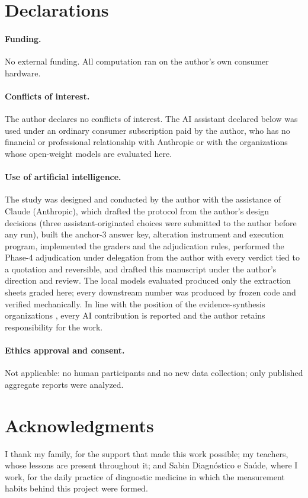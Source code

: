 \documentclass[11pt]{article}
\begin{document}
\section*{Declarations}
\paragraph{Funding.} No external funding. All computation ran on the author's own consumer hardware.

\paragraph{Conflicts of interest.} The author declares no conflicts of interest. The AI assistant declared below was used under an ordinary consumer subscription paid by the author, who has no financial or professional relationship with Anthropic or with the organizations whose open-weight models are evaluated here.

\paragraph{Use of artificial intelligence.} The study was designed and conducted by the author with the assistance of Claude (Anthropic), which drafted the protocol from the author's design decisions (three assistant-originated choices were submitted to the author before any run), built the anchor-3 answer key, alteration instrument and execution program, implemented the graders and the adjudication rules, performed the Phase-4 adjudication under delegation from the author with every verdict tied to a quotation and reversible, and drafted this manuscript under the author's direction and review. The local models evaluated produced only the extraction sheets graded here; every downstream number was produced by frozen code and verified mechanically. In line with the position of the evidence-synthesis organizations \citep{flemyng2025position}, every AI contribution is reported and the author retains responsibility for the work.

\paragraph{Ethics approval and consent.} Not applicable: no human participants and no new data collection; only published aggregate reports were analyzed.

\section*{Acknowledgments}
I thank my family, for the support that made this work possible; my teachers, whose lessons are present throughout it; and Sabin Diagnóstico e Saúde, where I work, for the daily practice of diagnostic medicine in which the measurement habits behind this project were formed.


\end{document}

